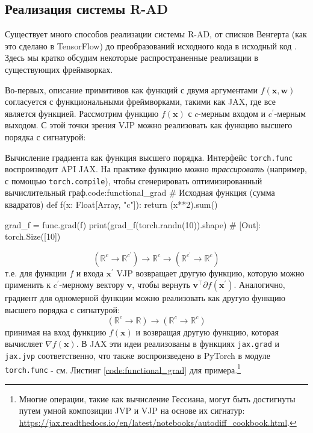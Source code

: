 \subsection{Реализация системы R-AD}
\label{subsec:implementing_rad}
%
Существует много способов реализации системы R-AD, от списков Венгерта (как это сделано в TensorFlow) до преобразований исходного кода в исходный код \cite{griewank2008evaluating}. Здесь мы кратко обсудим некоторые распространенные реализации в существующих фреймворках. 

Во-первых, описание примитивов как функций с двумя аргументами $f(\mathbf{x}, \mathbf{w})$ согласуется с функциональными фреймворками, такими как JAX, где все является функцией. Рассмотрим функцию $f(\mathbf{x})$ с $c$-мерным входом и $c^\prime$-мерным выходом. С этой точки зрения VJP можно реализовать как функцию высшего порядка с сигнатурой:

\begin{mypy}{Вычисление градиента как функция высшего порядка. Интерфейс {\footnotesize\texttt{torch.func}} воспроизводит API JAX. На практике функцию можно \textit{трассировать} (например, с помощью {\footnotesize\texttt{torch.compile}}), чтобы сгенерировать оптимизированный вычислительный граф.}{code:functional_grad}
# Исходная функция (сумма квадратов)
def f(x: Float[Array, "c"]):
  return (x**2).sum()

grad_f = func.grad(f)
print(grad_f(torch.randn(10)).shape) 
# [Out]: torch.Size([10])
\end{mypy}

\begin{equation}
(\mathbb{R}^c \rightarrow \mathbb{R}^{c^\prime}) \rightarrow \mathbb{R}^c \rightarrow (\mathbb{R}^{c^\prime} \rightarrow \mathbb{R}^c)
\end{equation}
%
т.е. для функции $f$ и входа $\mathbf{x}^\prime$ VJP возвращает другую функцию, которую можно применить к $c^\prime$-мерному вектору $\mathbf{v}$, чтобы вернуть $\mathbf{v}^\top \partial f(\mathbf{x}^\prime)$. Аналогично, градиент для одномерной функции можно реализовать как другую функцию высшего порядка с сигнатурой:
%
\begin{equation}
(\mathbb{R}^c \rightarrow \mathbb{R}) \rightarrow (\mathbb{R}^c \rightarrow \mathbb{R}^c)
\end{equation}
%
принимая на вход функцию $f(\mathbf{x})$ и возвращая другую функцию, которая вычисляет $\nabla f(\mathbf{x})$. В JAX эти идеи реализованы в функциях {\footnotesize\texttt{jax.grad}} и {\footnotesize\texttt{jax.jvp}} соответственно, что также воспроизведено в PyTorch в модуле {\footnotesize\texttt{torch.func}} - см. Листинг \ref{code:functional_grad} для примера.\footnote{Многие операции, такие как вычисление Гессиана, могут быть достигнуты путем умной композиции JVP и VJP на основе их сигнатур: \url{https://jax.readthedocs.io/en/latest/notebooks/autodiff_cookbook.html}.}

